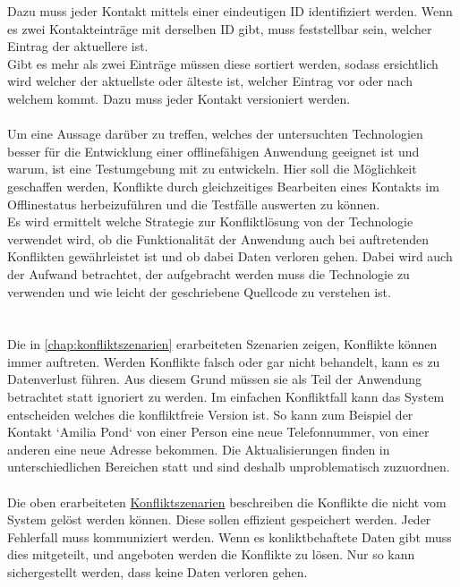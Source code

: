 Dazu muss jeder Kontakt mittels einer eindeutigen ID identifiziert werden. Wenn es zwei Kontakteinträge mit derselben ID gibt, muss feststellbar sein, welcher Eintrag der aktuellere ist.\\
Gibt es mehr als zwei Einträge müssen diese sortiert werden, sodass ersichtlich wird welcher der aktuellste oder älteste ist, welcher Eintrag vor oder nach welchem kommt. Dazu muss jeder Kontakt versioniert werden.\\\\
Um eine Aussage darüber zu treffen, welches der untersuchten Technologien besser für die Entwicklung einer offlinefähigen Anwendung geeignet ist und warum, ist eine Testumgebung mit zu entwickeln. Hier soll die Möglichkeit geschaffen werden, Konflikte durch gleichzeitiges Bearbeiten eines Kontakts im Offlinestatus herbeizuführen und die Testfälle auswerten zu können.\\
Es wird ermittelt welche Strategie zur Konfliktlösung von der Technologie verwendet wird, ob die Funktionalität der Anwendung auch bei auftretenden Konflikten gewährleistet ist und ob dabei Daten verloren gehen.
Dabei wird auch der Aufwand betrachtet, der aufgebracht werden muss die Technologie zu verwenden und wie leicht der geschriebene Quellcode zu verstehen ist.\\
\\\\
Die in \autoref{chap:konfliktszenarien} erarbeiteten Szenarien zeigen, Konflikte können immer auftreten. Werden Konflikte falsch oder gar nicht behandelt, kann es zu Datenverlust führen.
Aus diesem Grund müssen sie als Teil der Anwendung betrachtet statt ignoriert zu werden.
Im einfachen Konfliktfall kann das System entscheiden welches die konfliktfreie Version ist.
So kann zum Beispiel der Kontakt `Amilia Pond` von einer Person eine neue Telefonnummer, von einer anderen eine neue Adresse bekommen.
Die Aktualisierungen finden in unterschiedlichen Bereichen statt und sind deshalb unproblematisch zuzuordnen.\\\\
Die oben erarbeiteten \hyperref[chap:konfliktszenarien]{Konfliktszenarien} beschreiben die Konflikte die nicht vom System gelöst werden können.
Diese sollen effizient gespeichert werden.
Jeder Fehlerfall muss kommuniziert werden. Wenn es konliktbehaftete Daten gibt muss dies mitgeteilt, und angeboten werden die Konflikte zu lösen. Nur so kann sichergestellt werden, dass keine Daten verloren gehen.